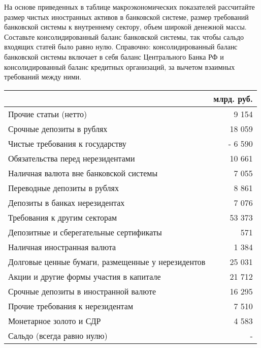 \documentclass[12pt, table]{exam}
\begin{document}
\setcounter{section}{0\relax}%
\noindent
\normalsize

\begin{questions}
\question[15] На основе приведенных в таблице макроэкономических показателей рассчитайте размер чистых иностранных активов в банковской системе, размер требований банковской системы к внутреннему сектору, объем широкой денежной массы. Составьте консолидированный баланс банковской системы, так чтобы сальдо входящих статей было равно нулю. Справочно: консолидированный баланс банковской системы включает в себя баланс Центрального Банка РФ и консолидированный баланс кредитных организаций, за вычетом взаимных требований между ними.

\small
\begin{tabularx}{\linewidth}[b]{@{}>{\raggedright\arraybackslash}Xr@{}}
	                                                   & млрд. руб. \\ \toprule
	Прочие статьи (нетто)                              & 9 154      \\
	Срочные депозиты в рублях                          & 18 059     \\
	Чистые требования к государству                    & -   6 590  \\
	Обязательства перед нерезидентами                  & 10 661     \\
	Наличная валюта вне банковской системы             & 7 055      \\
	Переводные депозиты в рублях                       & 8 861      \\
	Депозиты в банках нерезидентах                     & 7 076      \\
	Требования к другим секторам                       & 53 373     \\
	Депозитные и сберегательные сертификаты            & 571        \\
	Наличная иностранная валюта                        & 1 384      \\
	Долговые ценные бумаги, размещенные у нерезидентов & 25 031     \\
	Акции и другие формы участия в капитале            & 21 712     \\
	Срочные депозиты в иностранной валюте              & 16 295     \\
	Прочие требования к нерезидентам                   & 7 510      \\
	Монетарное золото и СДР                            & 4 583      \\
	Сальдо (всегда равно нулю)                         & -          \\ \bottomrule
\end{tabularx}%
\normalsize


\end{questions}
\end{document}
